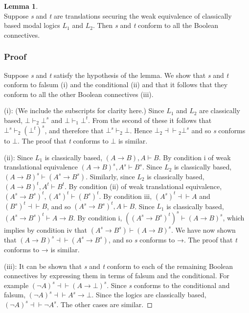 \documentclass[
  11pt,
  letterpaper,
  DIV=11,
  numbers=noendperiod,
  twoside]{scrartcl}
\begin{document}
\textbf{Lemma 1}.\\
Suppose \emph{s} and \emph{t} are translations securing the weak
equivalence of classically based modal logics \(L_1\) and \(L_2\). Then
\emph{s} and \emph{t} conform to all the Boolean connectives.

\subsubsection*{Proof}\label{proof-3}

Suppose \emph{s} and \emph{t} satisfy the hypothesis of the lemma. We
show that \emph{s} and \emph{t} conform to falsum (i) and the
conditional (ii) and that it follows that they conform to all the other
Boolean connectives (iii).

(i): (We include the subscripts for clarity here.) Since \(L_1\) and
\(L_2\) are classically based, \(\bot\vdash_2 \bot^s\) and
\(\bot \vdash_1 \bot^t\). From the second of these it follows that
\(\bot^s \vdash_2 (\bot^t)^s\), and therefore that
\(\bot^s \vdash_2 \bot\). Hence \(\bot_2\!{\dashv}{\vdash}\!_2 \bot^s\)
and so \emph{s} conforms to \(\bot\). The proof that \emph{t} conforms
to \(\bot\) is similar.

(ii): Since \(L_1\) is classically based,
\((A\rightarrow B),A \vdash B\). By condition i of weak translational
equivalence \((A\rightarrow B)^s, A^s \vdash B^s\). Since \(L_2\) is
classically based, \((A\rightarrow B)^s \vdash (A^s\rightarrow B^s)\).
Similarly, since \(L_2\) is classically based,
\((A\rightarrow B)^t,A^t \vdash B^t\). By condition (ii) of weak
translational equivalence,
\((A^s\rightarrow B^s)^t,(A^s)^t \vdash (B^s)^t\). By condition iii,
\((A^s)^t {\dashv}{\vdash}A\) and \((B^s)^t {\dashv}{\vdash}B\), and so
\((A^s\rightarrow B^s)^t,A \vdash B\). Since \(L_1\) is classically
based, \((A^s\rightarrow B^s)^t \vdash A\rightarrow B\). By condition i,
\(((A^s\rightarrow B^s)^t)^s \vdash (A\rightarrow B)^s\), which implies
by condition iv that \((A^s\rightarrow B^s) \vdash (A\rightarrow B)^s\).
We have now shown that
\((A\rightarrow B)^s{\dashv}{\vdash}(A^s\rightarrow B^s)\), and so
\emph{s} conforms to →. The proof that \emph{t} conforms to → is
similar.

(iii): It can be shown that \emph{s} and \emph{t} conform to each of the
remaining Boolean connectives by expressing them in terms of falsum and
the conditional. For example
\((\neg A)^s {\dashv}{\vdash} (A\rightarrow \bot)^s\). Since \emph{s}
conforms to the conditional and falsum,
\((\neg A)^s {\dashv}{\vdash} A^s \rightarrow \bot\). Since the logics
are classically based, \((\neg A)^s {\dashv}{\vdash} \neg A^s\). The
other cases are similar.~◻
\end{document}
